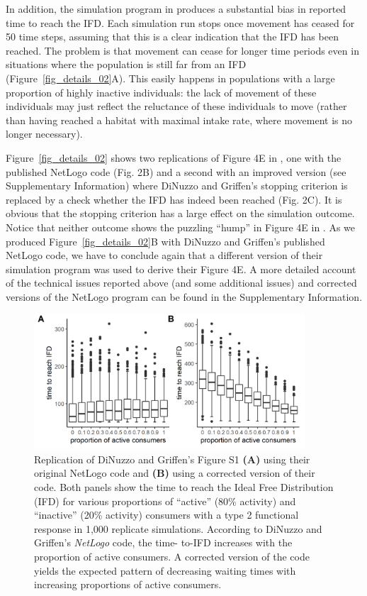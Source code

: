 \begin{interludeenv}
	In addition, the simulation program in \parencite{dinuzzo2020} produces a substantial bias in reported time to reach the IFD.
	Each simulation run stops once movement has ceased for 50 time steps, assuming that this is a clear indication that the IFD has been reached.
	The problem is that movement can cease for longer time periods even in situations where the population is still far from an IFD (Figure~\ref{fig_details_02}A).
	This easily happens in populations with a large proportion of highly inactive individuals: the lack of movement of these individuals may just reflect the reluctance of these individuals to move (rather than having reached a habitat with maximal intake rate, where movement is no longer necessary).
	
	Figure~\ref{fig_details_02} shows two replications of Figure 4E in \textcite{dinuzzo2020}, one with the published NetLogo code (Fig. 2B) and a second with an improved version (see Supplementary Information) where DiNuzzo and Griffen's stopping criterion is replaced by a check whether the IFD has indeed been reached (Fig. 2C).
	It is obvious that the stopping criterion has a large effect on the simulation outcome.
	Notice that neither outcome shows the puzzling ``hump'' in Figure 4E in \parencite{dinuzzo2020}.
	As we produced Figure~\ref{fig_details_02}B with DiNuzzo and Griffen's published NetLogo code, we have to conclude again that a different version of their simulation program was used to derive their Figure 4E.
	A more detailed account of the technical issues reported above (and some additional issues) and corrected versions of the NetLogo program can be found in the Supplementary Information.

	\begin{figure}[!h]
		\centering
		\includegraphics[width=0.9\textwidth]{figures/boxes/details1.png}
		\caption{
			Replication of DiNuzzo and Griffen's Figure S1 \textbf{(A)} using their original NetLogo code and \textbf{(B)} using a corrected version of their code. 
			Both panels show the time to reach the Ideal Free Distribution (IFD) for various proportions of ``active'' (80\% activity) and ``inactive'' (20\% activity) consumers with a type 2 functional response in 1,000 replicate simulations. 
			According to DiNuzzo and Griffen's \textit{NetLogo} code, the time- to-IFD increases with the proportion of active consumers. 
			A corrected version of the code yields the expected pattern of decreasing waiting times with increasing proportions of active consumers.
		}\label{fig_details_01}
	\end{figure}


\end{interludeenv}
